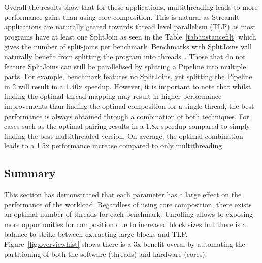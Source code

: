 Overall the results show that for these applications, multithreading leads to more performance gains than using core composition.
This is natural as StreamIt applications are naturally geared towards thread level parallelism (TLP) as most programs have at least one SplitJoin as seen in the Table~\ref{tab:instancefilt} which gives the number of split-joins per benchmark.
Benchmarks with SplitJoins will naturally benefit from splitting the program into threads~\cite{thiesStreamit2010}.
Those that do not feature SplitJoins can still be parallelised by splitting a Pipeline into multiple parts.
For example, benchmark  features no SplitJoins, yet splitting the Pipeline in 2 will result in a 1.40x speedup.
However, it is important to note that whilst finding the optimal thread mapping may result in higher performance improvements than finding the optimal composition for a single thread, the best performance is always obtained through a combination of both techniques.
For cases such as  the optimal pairing results in a 1.8x speedup compared to simply finding the best multithreaded version.
On average, the optimal combination leads to a 1.5x performance increase compared to only multithreading.

\subsection{Summary}
This section has demonstrated that each parameter has a large effect on the performance of the workload.
Regardless of using core composition, there exists an optimal number of threads for each benchmark.
Unrolling allows to exposing more opportunities for composition due to increased block sizes but there is a balance to strike between extracting large blocks and TLP.
Figure~\ref{fig:overviewhist} shows there is a 3x benefit overal by automating the partitioning of both the software (threads) and hardware (cores).

